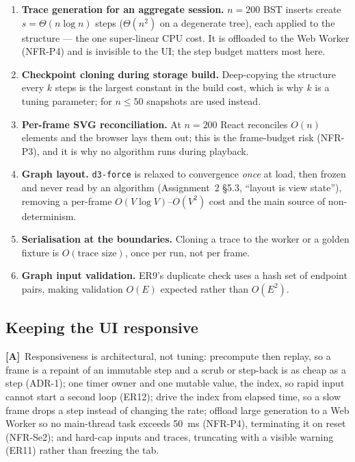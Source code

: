 \documentclass[11pt,a4paper]{article}
\newcommand{\A}{\textcolor{asmc}{\textbf{[A]}}}     %
\newcommand{\ct}[1]{\texttt{#1}}
\begin{document}
\begin{enumerate}[leftmargin=1.6em,topsep=2pt,itemsep=1pt]
  \item \textbf{Trace generation for an aggregate session.} $n=200$ BST inserts create
        $s=\Theta(n\log n)$ steps ($\Theta(n^2)$ on a degenerate tree), each applied to the
        structure --- the one super-linear CPU cost. It is offloaded to the Web Worker (NFR-P4)
        and is invisible to the UI; the step budget matters most here.
  \item \textbf{Checkpoint cloning during storage build.} Deep-copying the structure every $k$
        steps is the largest constant in the build cost, which is why $k$ is a tuning
        parameter; for $n \le 50$ snapshots are used instead.
  \item \textbf{Per-frame SVG reconciliation.} At $n = 200$ React reconciles $O(n)$ elements
        and the browser lays them out; this is the frame-budget risk (NFR-P3), and it is why no
        algorithm runs during playback.
  \item \textbf{Graph layout.} \ct{d3-force} is relaxed to convergence \emph{once} at load,
        then frozen and never read by an algorithm (Assignment~2 \S5.3, ``layout is view
        state''), removing a per-frame $O(V\log V)$--$O(V^2)$ cost and the main source of
        non-determinism.
  \item \textbf{Serialisation at the boundaries.} Cloning a trace to the worker or a golden
        fixture is $O(\text{trace size})$, once per run, not per frame.
  \item \textbf{Graph input validation.} ER9's duplicate check uses a hash set of endpoint
        pairs, making validation $O(E)$ expected rather than $O(E^2)$.
\end{enumerate}

\subsection{Keeping the UI responsive}

\A\ Responsiveness is architectural, not tuning: precompute then replay, so a frame is a repaint
of an immutable step and a scrub or step-back is as cheap as a step (ADR-1); one timer owner
and one mutable value, the index, so rapid input cannot start a second loop (ER12); drive the
index from elapsed time, so a slow frame drops a step instead of changing the rate; offload
large generation to a Web Worker so no main-thread task exceeds 50~ms (NFR-P4), terminating it
on reset (NFR-Se2); and hard-cap inputs and traces, truncating with a visible warning (ER11)
rather than freezing the tab.
\end{document}
